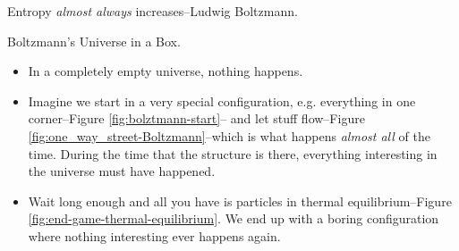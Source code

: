 \documentclass[]{article}
\begin{document}
Entropy \emph{almost always} increases--Ludwig Boltzmann.

Boltzmann's Universe in a Box.
\begin{itemize}
	\item  In a completely empty universe, nothing happens.
	\item Imagine we start in a very special configuration, e.g. everything in one corner--Figure \ref{fig:bolztmann-start}-- and let stuff flow--Figure \ref{fig:one_way_street-Boltzmann}--which is what happens \emph{almost all} of the time. During the time that the structure is there, everything interesting in the universe must have happened.
	\item Wait long enough and all you have is particles in thermal equilibrium--Figure \ref{fig:end-game-thermal-equilibrium}. We end up with a boring configuration where nothing interesting ever happens again.
\end{itemize}
\end{document}
